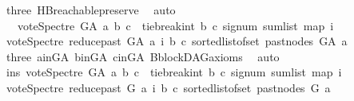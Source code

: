 \begin{isabellebody}
\ three\ HB{}{\isachardot}{\kern0pt}reachable{}{\isacharunderscore}{\kern0pt}preserve\ \isamarkupfalse%
\ auto\isanewline
\ \ \ \ \isamarkupfalse%
\ \isamarkupfalse%
\ \ {\isachardoublequoteopen}\ vote{\isacharunderscore}{\kern0pt}Spectre\ G{\isacharunderscore}{\kern0pt}A\ a\ b\ c\ {\isacharequal}{\kern0pt}\ {\isacharparenleft}{\kern0pt}tie{\isacharunderscore}{\kern0pt}break{\isacharunderscore}{\kern0pt}int\ b\ c\ {\isacharparenleft}{\kern0pt}signum\ {\isacharparenleft}{\kern0pt}sum{\isacharunderscore}{\kern0pt}list\ {\isacharparenleft}{\kern0pt}map\ {\isacharparenleft}{\kern0pt}{\isasymlambda}i{\isachardot}{\kern0pt}\isanewline
\ {\isacharparenleft}{\kern0pt}vote{\isacharunderscore}{\kern0pt}Spectre\ {\isacharparenleft}{\kern0pt}reduce{\isacharunderscore}{\kern0pt}past\ G{\isacharunderscore}{\kern0pt}A\ a{\isacharparenright}{\kern0pt}\ i\ b\ c{\isacharparenright}{\kern0pt}{\isacharparenright}{\kern0pt}\ {\isacharparenleft}{\kern0pt}sorted{\isacharunderscore}{\kern0pt}list{\isacharunderscore}{\kern0pt}of{\isacharunderscore}{\kern0pt}set\ {\isacharparenleft}{\kern0pt}past{\isacharunderscore}{\kern0pt}nodes\ G{\isacharunderscore}{\kern0pt}A\ a{\isacharparenright}{\kern0pt}{\isacharparenright}{\kern0pt}{\isacharparenright}{\kern0pt}{\isacharparenright}{\kern0pt}{\isacharparenright}{\kern0pt}{\isacharparenright}{\kern0pt}{\isachardoublequoteclose}\isanewline
\ \ \ \ \ \ \isamarkupfalse%
\ three\ a{\isacharunderscore}{\kern0pt}in{\isacharunderscore}{\kern0pt}G{\isacharunderscore}{\kern0pt}A\ b{\isacharunderscore}{\kern0pt}in{\isacharunderscore}{\kern0pt}G{\isacharunderscore}{\kern0pt}A\ c{\isacharunderscore}{\kern0pt}in{\isacharunderscore}{\kern0pt}G{\isacharunderscore}{\kern0pt}A\ B{}{\isachardot}{\kern0pt}blockDAG{\isacharunderscore}{\kern0pt}axioms\ \isamarkupfalse%
\ auto\isanewline
\ \ \ \ \isamarkupfalse%
\ \isamarkupfalse%
\ ins{\isacharunderscore}{\kern0pt}{}{\isacharcolon}{\kern0pt}\ {\isachardoublequoteopen}vote{\isacharunderscore}{\kern0pt}Spectre\ G{\isacharunderscore}{\kern0pt}A\ a\ b\ c\ {\isacharequal}{\kern0pt}\ {\isacharparenleft}{\kern0pt}tie{\isacharunderscore}{\kern0pt}break{\isacharunderscore}{\kern0pt}int\ b\ c\ {\isacharparenleft}{\kern0pt}signum\ {\isacharparenleft}{\kern0pt}sum{\isacharunderscore}{\kern0pt}list\ {\isacharparenleft}{\kern0pt}map\ {\isacharparenleft}{\kern0pt}{\isasymlambda}i{\isachardot}{\kern0pt}\isanewline
\ {\isacharparenleft}{\kern0pt}vote{\isacharunderscore}{\kern0pt}Spectre\ {\isacharparenleft}{\kern0pt}reduce{\isacharunderscore}{\kern0pt}past\ G\ a{\isacharparenright}{\kern0pt}\ i\ b\ c{\isacharparenright}{\kern0pt}{\isacharparenright}{\kern0pt}\ {\isacharparenleft}{\kern0pt}sorted{\isacharunderscore}{\kern0pt}list{\isacharunderscore}{\kern0pt}of{\isacharunderscore}{\kern0pt}set\ {\isacharparenleft}{\kern0pt}past{\isacharunderscore}{\kern0pt}nodes\ G\ a{\isacharparenright}{\kern0pt}{\isacharparenright}{\kern0pt}{\isacharparenright}{\kern0pt}{\isacharparenright}{\kern0pt}{\isacharparenright}{\kern0pt}{\isacharparenright}{\kern0pt}{\isachardoublequoteclose}\isanewline

\end{isabellebody}
